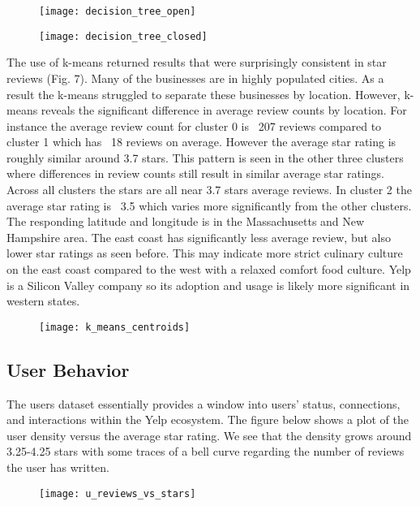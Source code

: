 \begin{figure}[h]
\texttt{[image: decision\_tree\_open]}
\end{figure}

\begin{figure}[h]
\texttt{[image: decision\_tree\_closed]}
\end{figure}

\quad The use of k-means returned results that were surprisingly consistent in star reviews (Fig. 7). Many of the businesses are in highly populated cities. As a result the k-means struggled to separate these businesses by location. However, k-means reveals the significant difference in average review counts by location. For instance the average review count for cluster 0 is ~207 reviews compared to cluster 1 which has ~18 reviews on average. However the average star rating is roughly similar around 3.7 stars. This pattern is seen in the other three clusters where differences in review counts still result in similar average star ratings. Across all clusters the stars are all near 3.7 stars average reviews. In cluster 2 the average star rating is ~3.5 which varies more significantly from the other clusters. The responding latitude and longitude is in the Massachusetts and New Hampshire area. The east coast has significantly less average review, but also lower star ratings as seen before. This may indicate more strict culinary culture on the east coast compared to the west with a relaxed comfort food culture. Yelp is a Silicon Valley company so its adoption and usage is likely more significant in western states.

\begin{figure}[h]
\texttt{[image: k\_means\_centroids]}
\end{figure}

\subsection{User Behavior}

\quad The users dataset essentially provides a window into users' status, connections, and interactions within the Yelp ecosystem. The figure below shows a plot of the user density versus the average star rating. We see that the density grows around 3.25-4.25 stars with some traces of a bell curve regarding the number of reviews the user has written.

\begin{figure}[!h]
\texttt{[image: u\_reviews\_vs\_stars]}
\end{figure}

